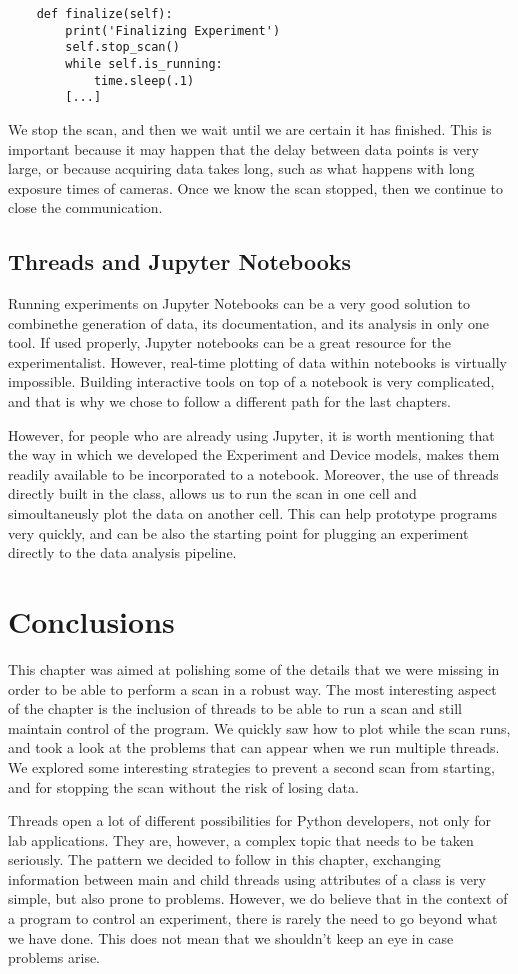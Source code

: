 \begin{verbatim}
    def finalize(self):
        print('Finalizing Experiment')
        self.stop_scan()
        while self.is_running:
            time.sleep(.1)
        [...]
\end{verbatim}

We stop the scan, and then we wait until we are certain it has finished. This is important because it may happen that the delay between data points is very large, or because acquiring data takes long, such as what happens with long exposure times of cameras. Once we know the scan stopped, then we continue to close the communication.

\subsection{Threads and Jupyter Notebooks}\label{subsection:Jupyter}
Running experiments on Jupyter Notebooks can be a very good solution to combinethe generation of data, its documentation, and its analysis in only one tool. If used properly, Jupyter notebooks can be a great resource for the experimentalist. However, real-time plotting of data within notebooks is virtually impossible. Building interactive tools on top of a notebook is very complicated, and that is why we chose to follow a different path for the last chapters.

However, for people who are already using Jupyter, it is worth mentioning that the way in which we developed the Experiment and Device models, makes them readily available to be incorporated to a notebook. Moreover, the use of threads directly built in the class, allows us to run the scan in one cell and simoultaneusly plot the data on another cell. This can help prototype programs very quickly, and can be also the starting point for plugging an experiment directly to the data analysis pipeline.

\section{Conclusions}\label{section:conclusions-run-experiment}
This chapter was aimed at polishing some of the details that we were missing in order to be able to perform a scan in a robust way. The most interesting aspect of the chapter is the inclusion of threads to be able to run a scan and still maintain control of the program. We quickly saw how to plot while the scan runs, and took a look at the problems that can appear when we run multiple threads. We explored some interesting strategies to prevent a second scan from starting, and for stopping the scan without the risk of losing data.

Threads open a lot of different possibilities for Python developers, not only for lab applications. They are, however, a complex topic that needs to be taken seriously. The pattern we decided to follow in this chapter, exchanging information between main and child threads using attributes of a class is very simple, but also prone to problems. However, we do believe that in the context of a program to control an experiment, there is rarely the need to go beyond what we have done. This does not mean that we shouldn't keep an eye in case problems arise.
